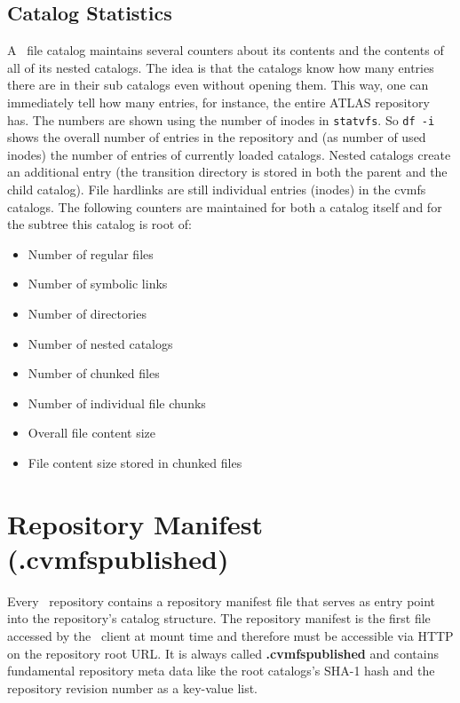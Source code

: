 \subsection{Catalog Statistics}
A \cvmfs\ file catalog maintains several counters about its contents and the contents of all of its nested catalogs. 
The idea is that the catalogs know how many entries there are in their sub catalogs even without opening them.
This way, one can immediately tell how many entries, for instance, the entire ATLAS repository has. 
The numbers are shown using the number of inodes in \texttt{statvfs}. 
So \texttt{df -i} shows the overall number of entries in the repository and (as number of used inodes) the number of entries of currently loaded catalogs. 
Nested catalogs create an additional entry (the transition directory is stored in both the parent and the child catalog). 
File hardlinks are still individual entries (inodes) in the cvmfs catalogs.
The following counters are maintained for both a catalog itself and for the subtree this catalog is root of:
\begin{itemize}
	\item Number of regular files
	\item Number of symbolic links
	\item Number of directories
	\item Number of nested catalogs
	\item Number of chunked files
	\item Number of individual file chunks
	\item Overall file content size
	\item File content size stored in chunked files
\end{itemize}


\pagebreak
\section{Repository Manifest (.cvmfspublished)}
\label{sct:cvmfspublished}
Every \cvmfs\ repository contains a repository manifest file that serves as entry point into the repository's catalog structure.
The repository manifest is the first file accessed by the \cvmfs\ client at mount time and therefore must be accessible via HTTP on the repository root URL.
It is always called \textbf{.cvmfspublished} and contains fundamental repository meta data like the root catalogs's SHA-1 hash and the repository revision number as a key-value list.

